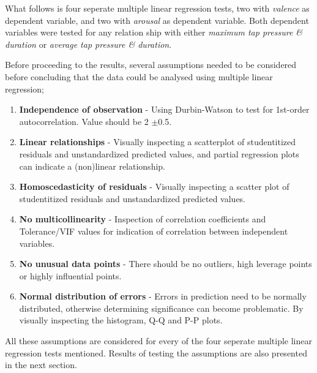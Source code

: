 \documentclass{sigchi}
\begin{document}
What follows is four seperate multiple linear regression tests, two with \textit{valence} as dependent variable, and two with \textit{arousal} as dependent variable. Both dependent variables were tested for any relation ship with either \textit{maximum tap pressure \& duration} or \textit{average tap pressure \& duration}.

Before proceeding to the results, several assumptions needed to be considered before concluding that the data could be analysed using multiple linear regression;
\begin{enumerate}
  \item \textbf{Independence of observation} - Using Durbin-Watson to test for 1st-order autocorrelation. Value should be 2 $\pm$0.5.
  \item \textbf{Linear relationships} - Visually inspecting a scatterplot of studentitized residuals and unstandardized predicted values, and partial regression plots can indicate a (non)linear relationship.
  \item \textbf{Homoscedasticity of residuals} - Visually inspecting a scatter plot of studentitized residuals and unstandardized predicted values.
  \item \textbf{No multicollinearity} - Inspection of correlation coefficients and Tolerance/VIF values for indication of correlation between independent variables.
  \item \textbf{No unusual data points} - There should be no outliers, high leverage points or highly influential points.
  \item \textbf{Normal distribution of errors} - Errors in prediction need to be normally distributed, otherwise determining significance can become problematic. By visually inspecting the histogram, Q-Q and P-P plots.
\end{enumerate}
All these assumptions are considered for every of the four seperate multiple linear regression tests mentioned. Results of testing the assumptions are also presented in the next section.

\end{document}
